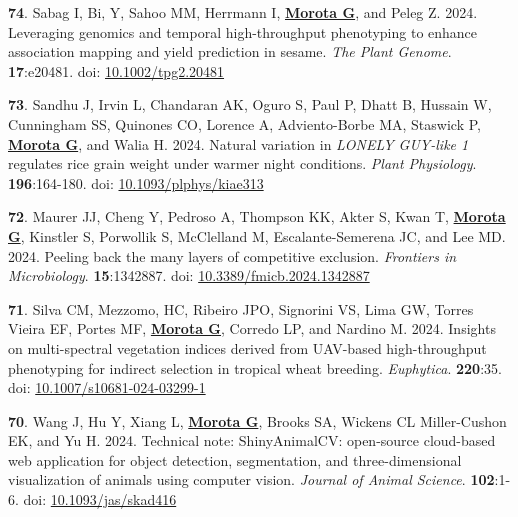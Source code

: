 \documentclass[margin,line,10pt]{res}
\newenvironment{list1}{
  \begin{list}{\ding{113}}{%
      \setlength{\itemsep}{0in}
      \setlength{\parsep}{0in} \setlength{\parskip}{0in}
      \setlength{\topsep}{0in} \setlength{\partopsep}{0in} 
      \setlength{\leftmargin}{0.17in}}}{\end{list}}
\begin{document}
\begin{resume}
\begin{list1}
  \vspace{0.5cm}

  \item  [{\bf 74}.] Sabag I, Bi, Y, Sahoo MM, Herrmann I, \textbf{\underline{Morota G}}, and Peleg Z. 2024. Leveraging genomics and temporal high-throughput phenotyping to enhance association mapping and yield prediction in sesame. \emph{The Plant Genome}. \textbf{17}:e20481. doi: \textcolor{blue}{\href{https://doi.org/10.1002/tpg2.20481}{10.1002/tpg2.20481}}
  
  \vspace{0.5cm}


  \item  [{\bf 73}.] Sandhu J, Irvin L, Chandaran AK, Oguro S, Paul P, Dhatt B, Hussain W, Cunningham SS, Quinones CO, Lorence A, Adviento-Borbe MA, Staswick P, \textbf{\underline{Morota G}}, and Walia H. 2024. Natural variation in {\it LONELY GUY-like 1} regulates rice grain weight under warmer night conditions. \emph{Plant Physiology}. \textbf{196}:164-180. doi: \textcolor{blue}{\href{https://doi.org/10.1093/plphys/kiae313}{10.1093/plphys/kiae313}}

  \vspace{0.5cm}

  \item  [{\bf 72}.] Maurer JJ, Cheng Y, Pedroso A, Thompson KK, Akter S, Kwan T, \textbf{\underline{Morota G}}, Kinstler S, Porwollik S, McClelland M, Escalante-Semerena JC, and Lee MD. 2024. Peeling back the many layers of competitive exclusion. \emph{Frontiers in Microbiology}. \textbf{15}:1342887. doi: \textcolor{blue}{\href{https://doi.org/10.3389/fmicb.2024.1342887}{10.3389/fmicb.2024.1342887}}

  \vspace{0.5cm}

  \item  [{\bf 71}.]  Silva CM, Mezzomo, HC, Ribeiro JPO, Signorini VS, Lima GW, Torres Vieira EF, Portes MF, \textbf{\underline{Morota G}}, Corredo LP, and Nardino M. 2024. Insights on multi-spectral vegetation indices derived from UAV-based high-throughput phenotyping for indirect selection in tropical wheat breeding. \emph{Euphytica}. \textbf{220}:35. doi: \textcolor{blue}{\href{https://doi.org/10.1007/s10681-024-03299-1}{10.1007/s10681-024-03299-1}}

  \vspace{0.5cm}

  \item  [{\bf 70}.] Wang J, Hu Y, Xiang L, \textbf{\underline{Morota G}}, Brooks SA, Wickens CL Miller-Cushon EK, and Yu H. 2024. Technical note: ShinyAnimalCV: open-source cloud-based web application for object detection, segmentation, and three-dimensional visualization of animals using computer vision. \emph{Journal of Animal Science}. \textbf{102}:1-6. doi: \textcolor{blue}{\href{https://doi.org/10.1093/jas/skad416}{10.1093/jas/skad416}}



\end{list1}
\end{resume}
\end{document}
